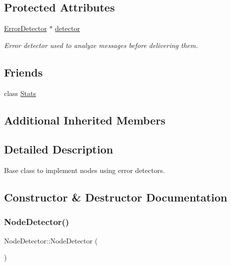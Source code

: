 \subsection*{Protected Attributes}
\begin{DoxyCompactItemize}
\item 
\hyperlink{class_error_detector}{Error\+Detector} $\ast$ \hyperlink{class_node_detector_a711fd643dc29b74e6dfe87e1aeb1b227}{detector}
\begin{DoxyCompactList}\small\item\em Error detector used to analyze messages before delivering them. \end{DoxyCompactList}\end{DoxyCompactItemize}
\subsection*{Friends}
\begin{DoxyCompactItemize}
\item 
class \hyperlink{class_node_detector_a129f65b6976377739eb6231b6962985e}{Stats}
\end{DoxyCompactItemize}
\subsection*{Additional Inherited Members}


\subsection{Detailed Description}
Base class to implement nodes using error detectors. 

\subsection{Constructor \& Destructor Documentation}
\mbox{\label{class_node_detector_a256160d034631f4fa14a83787f504aae}} 
\subsubsection{\texorpdfstring{Node\+Detector()}{NodeDetector()}}
{\footnotesize\ttfamily Node\+Detector\+::\+Node\+Detector (\begin{DoxyParamCaption}{ }\end{DoxyParamCaption})\hspace{0.3cm}{\ttfamily [protected]}}

